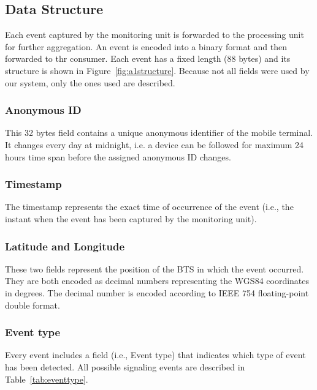 \documentclass[master,english]{hgbthesis}
\begin{document}
\subsection{Data Structure}
\label{sec:dataa1}
Each event captured by the monitoring unit is forwarded to the processing unit for further aggregation. An event is encoded into a binary format and then forwarded to thr consumer. Each event has a fixed length (88 bytes) and its structure is shown in Figure~\ref{fig:a1structure}.
Because not all fields were used by our system, only the ones used are described.
\subsubsection{Anonymous ID}
\label{sec:anonymous}
This 32 bytes field contains a unique anonymous identifier of the mobile terminal. It changes every day at midnight, i.e. a device can be followed for maximum 24 hours time span before the assigned anonymous ID changes.
\subsubsection{Timestamp} The timestamp represents the exact time of occurrence of the event (i.e., the instant when the event has been captured by the monitoring unit).
\subsubsection{Latitude and Longitude}
These two fields represent the position of the BTS in which the event occurred. They are both encoded as decimal numbers representing the WGS84 coordinates in degrees. The decimal number is encoded according to IEEE 754 floating-point double format\cite{IEEE754}.
\subsubsection{Event type}
Every event includes a field (i.e., Event type) that indicates which type of event
has been detected. All possible signaling events are described in Table~\ref{tab:eventtype}.
\end{document}
